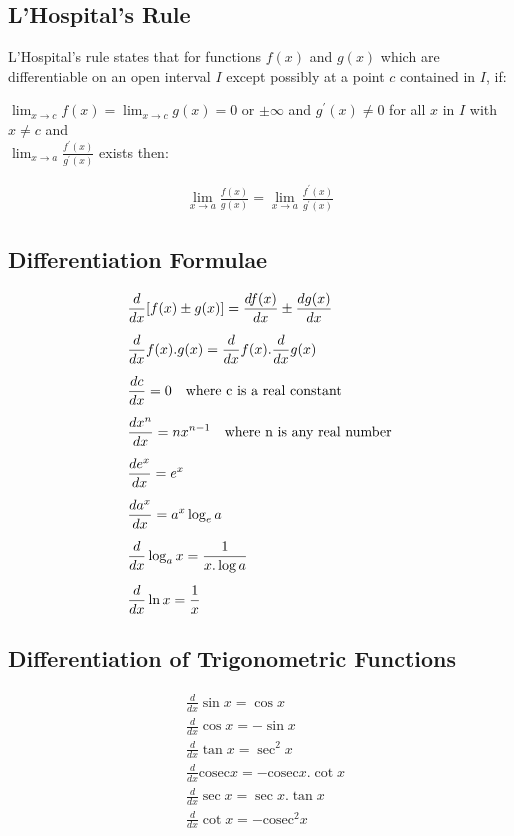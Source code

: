 \subsection{L'Hospital's Rule}
L'Hospital's rule states that for functions $f(x)$ and $g(x)$ which are differentiable on an open interval $I$ except possibly at a point $c$ contained in $I$, if:

\vspace{5mm}

\noindent
$ \lim_{x \to c} f(x) = \lim_{x \to c} g(x) = 0$ or $\pm \infty $ and $g^{'}(x)\neq 0$ for all $x$ in $I$ with $x \neq c$ and \\

\noindent
$\lim_{x \to a} \frac{f^{'}(x)}{g^{'}(x)}$ exists then:

\begin{tcolorbox}
\begin{center}
\begin{align*}
\lim_{x \to a} \frac{f(x)}{g(x)} = \lim_{x \to a} \frac{f^{'}(x)}{g^{'}(x)}
\end{align*}
\end{center}
\end{tcolorbox} 

\vspace{-3mm}

\subsection{Differentiation Formulae}
\begin{align*}
&\frac{d}{dx}[f(x) \pm g(x)] = \frac{df(x)}{dx} \pm\frac{dg(x)}{dx}\\[5pt]
&\frac{d}{dx}f(x).g(x) = \frac{d}{dx}f(x).\frac{d}{dx}g(x)\\[5pt]
&\frac{dc}{dx} = 0 \quad \text{where c is a real constant} \\[5pt]
&\frac{d x^n}{dx} = nx^{n-1} \quad \text{where n is any real number}\\[5pt]
\vspace{5mm}
&\frac{de^x}{dx} = e^x \\[5pt]
&\frac{da^x}{dx} = a^x\log_{e}a \\[5pt]
&\frac{d}{dx}\log_a x = \frac{1}{x. \log a} \\[5pt]
&\frac{d}{dx}\ln x = \frac{1}{x}
\end{align*}

\subsection{Differentiation of Trigonometric Functions}
\begin{align*}
&\frac{d}{dx}\sin x = \cos x \\[5pt]
&\frac{d}{dx} \cos x = -\sin x \\[5pt]
&\frac{d}{dx} \tan x = \sec^{2} x \\[5pt]
&\frac{d}{dx} \mathrm{cosec} x = -\mathrm{cosec}x . \cot x \\[5pt]
&\frac{d}{dx}\sec x = \sec x. \tan x \\[5pt]
&\frac{d}{dx}\cot x = - \mathrm{cosec} ^2 x 
\end{align*}

